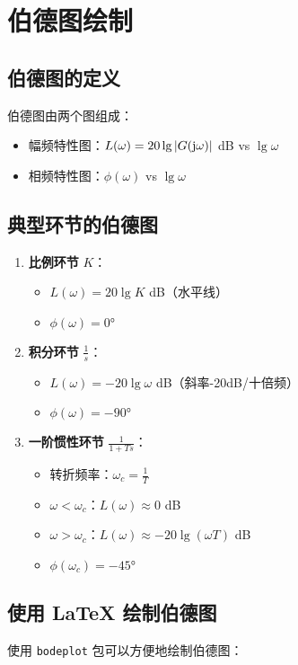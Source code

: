 \section{伯德图绘制}

\subsection{伯德图的定义}
伯德图由两个图组成：
\begin{itemize}
    \item 幅频特性图：$L(\omega) = 20\lg|G(\mathrm{j}\omega)|$ dB vs $\lg\omega$
    \item 相频特性图：$\phi(\omega)$ vs $\lg\omega$
\end{itemize}

\subsection{典型环节的伯德图}
\begin{enumerate}
    \item \textbf{比例环节} $K$：
    \begin{itemize}
        \item $L(\omega) = 20\lg K$ dB（水平线）
        \item $\phi(\omega) = 0°$
    \end{itemize}
    
    \item \textbf{积分环节} $\frac{1}{s}$：
    \begin{itemize}
        \item $L(\omega) = -20\lg\omega$ dB（斜率-20dB/十倍频）
        \item $\phi(\omega) = -90°$
    \end{itemize}
    
    \item \textbf{一阶惯性环节} $\frac{1}{1+Ts}$：
    \begin{itemize}
        \item 转折频率：$\omega_c = \frac{1}{T}$
        \item $\omega < \omega_c$：$L(\omega) \approx 0$ dB
        \item $\omega > \omega_c$：$L(\omega) \approx -20\lg(\omega T)$ dB
        \item $\phi(\omega_c) = -45°$
    \end{itemize}
\end{enumerate}

\subsection{使用 LaTeX 绘制伯德图}
使用 \texttt{bodeplot} 包可以方便地绘制伯德图：

